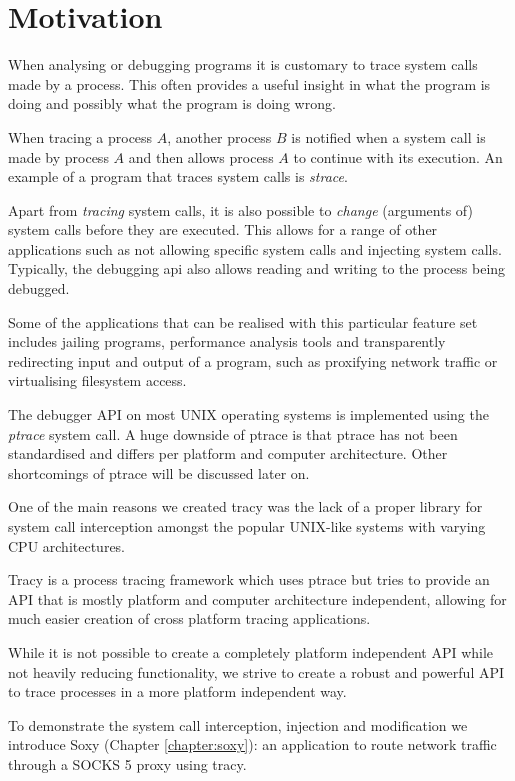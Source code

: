 \documentclass[a4paper, 10pt]{report}
\begin{document}
\chapter{Motivation}

When analysing or debugging programs it is customary to trace system calls made
by a process. This often provides a useful insight in what the program is doing
and possibly what the program is doing wrong.

When tracing a process $A$, another process $B$ is notified when a system call
is made by process $A$  and then allows process $A$ to continue with its
execution. An example of a program that traces system calls is
\textit{strace}\cite{strace}.

Apart from \textit{tracing} system calls, it is also possible to
\textit{change}
(arguments of) system calls before they are executed. This allows for a range
of other applications such as not allowing specific system calls and
injecting system calls. Typically, the debugging api also allows reading and
writing to the process being debugged.

Some of the applications that can be realised with this particular feature set
includes jailing programs, performance analysis tools and transparently
redirecting input and output of a program, such as proxifying network
traffic or virtualising filesystem access.

The debugger API on most UNIX operating systems is implemented using the
\textit{ptrace} system call. A huge downside of ptrace is that ptrace
has not been standardised and differs per platform and computer architecture.
Other shortcomings of ptrace will be discussed later on.

One of the main reasons we created tracy was the lack of a proper library
for system call interception amongst the popular UNIX-like systems with
varying CPU architectures.

Tracy is a process tracing framework which uses ptrace but tries to provide
an API that is mostly platform and computer architecture independent,
allowing for much easier creation of cross platform tracing applications.

While it is not possible to create a completely platform independent API while
not heavily reducing functionality, we strive to create a robust and powerful
API to trace processes in a more platform independent way.

To demonstrate the system call interception, injection and modification
we introduce Soxy (Chapter \ref{chapter:soxy}): an application to route network
traffic through a SOCKS 5 proxy using tracy.
\end{document}
